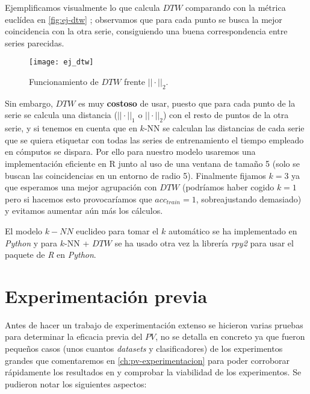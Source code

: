Ejemplificamos visualmente lo que calcula $DTW$ comparando con la métrica euclídea en \autoref{fig:ej-dtw} \cite{volny2012employing}; observamos que para cada punto se busca la mejor coincidencia con la otra serie, consiguiendo una buena correspondencia entre series parecidas.

\begin{figure}[htbp]
  \centering
  \texttt{[image: ej\_dtw]}
  \caption{Funcionamiento de $DTW$ frente $||\cdot||_2$.}
  \label{fig:ej-dtw}
\end{figure}

Sin embargo, $DTW$ es muy \textbf{costoso} de usar, puesto que para cada punto de la serie se calcula una distancia ($||\cdot||_1$ o $||\cdot||_2$) con el resto de puntos de la otra serie, y si tenemos en cuenta que en $k$-NN se calculan las distancias de cada serie que se quiera etiquetar con todas las series de entrenamiento el tiempo empleado en cómputos se dispara. Por ello para nuestro modelo usaremos una implementación eficiente en R \cite{leodolter2020dtw} junto al uso de una ventana de tamaño 5 (solo se buscan las coincidencias en un entorno de radio 5). Finalmente fijamos $k = 3$ ya que esperamos una mejor agrupación con $DTW$ (podríamos haber cogido $k=1$ pero si hacemos esto provocaríamos que $acc_{train} = 1$, sobreajustando demasiado) y evitamos aumentar aún más los cálculos.

El modelo $k-NN$ euclideo para tomar el $k$ automático se ha implementado en \emph{Python} y para $k$-NN + $DTW$ se ha usado otra vez la librería \emph{rpy2} para usar el paquete de \emph{R} en \emph{Python}.

\section{Experimentación previa}

Antes de hacer un trabajo de experimentación extenso se hicieron varias pruebas para determinar la eficacia previa del $PV$, no se detalla en concreto ya que fueron pequeños casos (unos cuantos \emph{datasets} y clasificadores) de los experimentos grandes que comentaremos en \autoref{ch:pv-experimentacion} para poder corroborar rápidamente los resultados en \cite{zhang2019perturbation} y comprobar la viabilidad de los experimentos. Se pudieron notar los siguientes aspectos:

